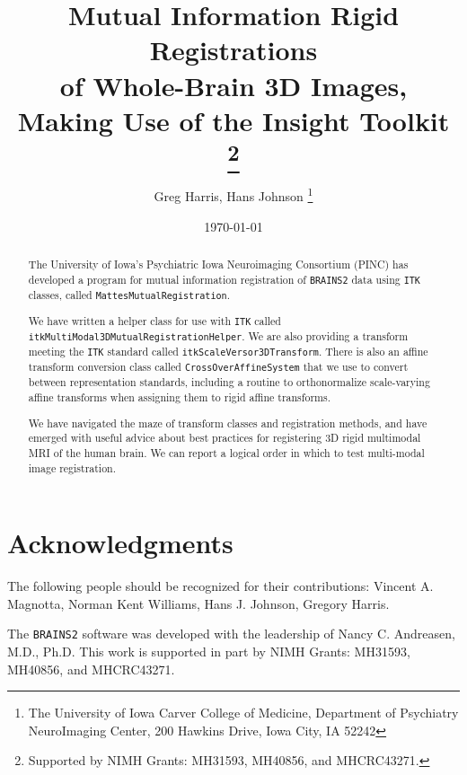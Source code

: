 \documentclass [10pt,twocolumn,twoside,final,letterpaper]{report}
\newcommand{\bcode}{\texttt}
\newcommand{\brainstwoprog}{\bcode{BRAINS2}}
\newcommand{\miregprog}{\bcode{MattesMutualRegistration}}
\begin{document}
\title{ {
    Mutual Information Rigid Registrations\\
    of Whole-Brain 3D Images,\\
    Making Use of the Insight Toolkit}
    \thanks{Supported by NIMH Grants:
MH31593, MH40856, and MHCRC43271.} \\
\vspace{0.5in}
}
\author{Greg Harris, Hans Johnson
\thanks{ The University of Iowa Carver College of Medicine,
Department of Psychiatry NeuroImaging Center,
200 Hawkins Drive, Iowa City, IA 52242 }
}
\date{\today}
\maketitle

\onecolumn
\begin{abstract}
The University of Iowa's Psychiatric Iowa Neuroimaging 
Consortium (PINC)
has developed a program for mutual information registration 
of \brainstwoprog{} \cite{magnotta:brains2} data
using \bcode{ITK} \cite{ibanez:ITKSoftwareGuide14} classes, 
called \miregprog{}.
\vspace{0.25in}\par
We have written a helper class for use with \bcode{ITK} 
called \bcode{itkMultiModal3DMutualRegistrationHelper}.
We are also providing a transform meeting the \bcode{ITK} standard
called \bcode{itkScaleVersor3DTransform}.
There is also an affine transform conversion class
called \bcode{CrossOverAffineSystem} that we use to convert
between representation standards, including a routine to 
orthonormalize scale-varying affine transforms when assigning
them to rigid affine transforms.
\vspace{0.25in}\par
We have navigated the maze of transform classes and registration
methods, and have emerged with useful advice about best practices
for registering 3D rigid multimodal MRI of the human brain.
We can report a logical order in which to test multi-modal image registration.
\end{abstract}

\chapter*{Acknowledgments} 
\label{sec:acknowledgementsknow}

The following people should be recognized for
their contributions: Vincent A. Magnotta, Norman Kent Williams, 
Hans J. Johnson, Gregory Harris.
\vspace{0.25in}\par
The \brainstwoprog{} software was developed with the leadership of
Nancy C. Andreasen, M.D., Ph.D.
This work is supported in part by NIMH Grants:
MH31593, MH40856, and MHCRC43271.
\end{document}
